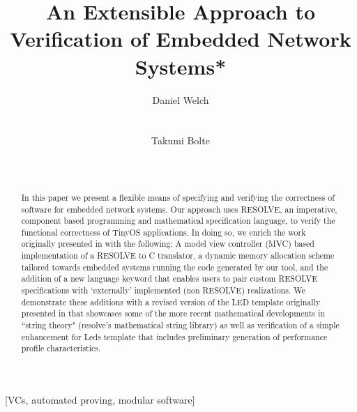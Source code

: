 \documentclass{sig-alternate}
\begin{document}
\title{An Extensible Approach to Verification of Embedded Network Systems*}

\author{
\alignauthor
Daniel Welch\\
\\
\\
\alignauthor
Takumi Bolte\\
\\
\\
}

\maketitle
\begin{abstract}

In this paper we present a flexible means of specifying and verifying the correctness of software for embedded network systems. Our approach uses RESOLVE, an imperative, component based programming and mathematical specification language, to verify the functional correctness of TinyOS applications. In doing so, we enrich the work originally presented in \cite{regula:2010} with the following: A model view controller (MVC) based implementation of a RESOLVE to C translator, a dynamic memory allocation scheme tailored towards embedded systems running the code generated by our tool, and the addition of a new language keyword that enables users to pair custom RESOLVE specifications with `externally' implemented (non RESOLVE) realizations. We demonstrate these additions with a revised version of the LED template originally presented in \cite{regula:2010} that showcases some of the more recent mathematical developments in ``string theory" (resolve's mathematical string library) as well as verification of a simple enhancement for Leds template that includes preliminary generation of performance profile characteristics.
\end{abstract}

[VCs, automated proving, modular software]
\end{document}
